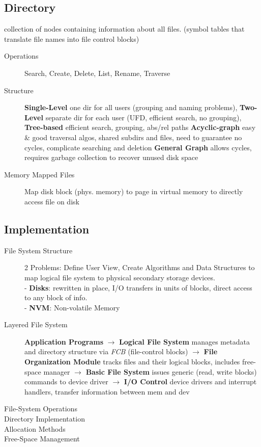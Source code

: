 \subsection*{Directory}
collection of nodes containing information about all files. (symbol tables that translate file names into file control blocks)
\begin{description}
    \item[Operations]Search, Create, Delete, List, Rename, Traverse
    \item[Structure] \textbf{Single-Level} one dir for all users (grouping and naming problems), \textbf{Two-Level} separate dir for each user (UFD, efficient search, no grouping), \textbf{Tree-based} efficient search, grouping, abs/rel paths \textbf{Acyclic-graph} easy \& good traversal algos, shared subdirs and files, need to guarantee no cycles, complicate searching and deletion \textbf{General Graph} allows cycles, requires garbage collection to recover unused disk space %
    \item[Memory Mapped Files] Map disk block (phys. memory) to page in virtual memory to directly access file on disk
\end{description}
\subsection*{Implementation}
\begin{description}
    \item[File System Structure]2 Problems: Define User View, Create Algorithms and Data Structures to map logical file system to physical secondary storage devices.\\
        - \textbf{Disks}: rewritten in place, I/O transfers in units of blocks, direct access to any block of info. \\
        - \textbf{NVM}: Non-volatile Memory \\
    \item[Layered File System]\textbf{Application Programs} $\rightarrow$ \textbf{Logical File System} manages metadata and directory structure via \textit{FCB} (file-control blocks) $\rightarrow$ \textbf{File Organization Module} tracks files and their logical blocks, includes free-space manager $\rightarrow$ \textbf{Basic File System} issues generic (read, write blocks) commands to device driver $\rightarrow$ \textbf{I/O Control} device drivers and interrupt handlers, transfer information between mem and dev
    \item[File-System Operations] %
    \item[Directory Implementation]
    \item[Allocation Methods]
    \item[Free-Space Management]
\end{description}
